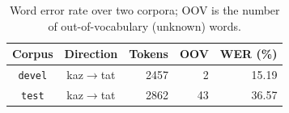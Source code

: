 \documentclass[a4paper,11pt]{article}
\begin{document}
\begin{table}
  \begin{center}
  \begin{tabular}{ccrrr}
  \toprule
   Corpus                 & Direction           & Tokens  & OOV & WER (\%) \\
  \midrule
  \texttt{devel} & kaz$\rightarrow$tat & 2457    & 2       & 15.19 \\
  \texttt{test} & kaz$\rightarrow$tat & 2862    & 43      & 36.57 \\
  \bottomrule
  \end{tabular}
    \caption{Word error rate over two corpora; OOV is the number of out-of-vocabulary (unknown) words.}
    \label{table:wer-development}
  \end{center}
\end{table}
\end{document}
